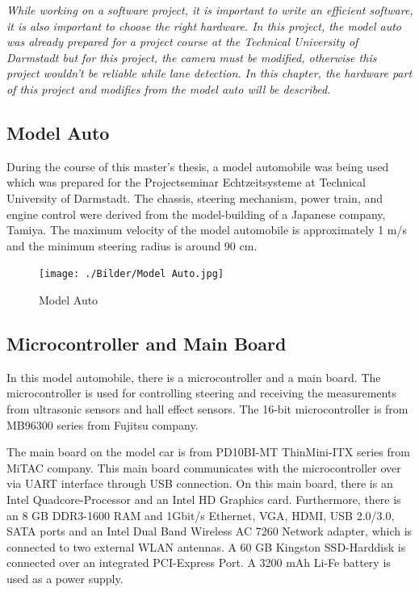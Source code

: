 \emph{\color{blue}While working on a software project, it is important to write an efficient software, it is also important to choose the right hardware. In this project, the model auto was already prepared for a project course at the Technical University of Darmstadt but for this project, the camera must be modified, otherwise this project wouldn't be reliable while lane detection. In this chapter, the hardware part of this project and modifies from the model auto will be described.} 


%
\subsection{Model Auto}\label{sec:Model Auto}


During the course of this master's thesis, a model automobile was being used which was prepared for the Projectseminar 
Echtzeitsysteme at Technical University of Darmstadt. The chassis, steering mechanism, power train, and engine control 
were derived from the model-building of a Japanese company, Tamiya. The maximum velocity of the model automobile is 
approximately 1 m/s and the minimum steering radius is around 90 cm. 

\begin{figure}[H]
	\centering
	\hspace*{0cm}   
	\texttt{[image: ./Bilder/Model Auto.jpg]}
	\caption{Model Auto}
\end{figure}

%
\subsection{Microcontroller and Main Board}\label{sec:Microcontroller and Main Board}


In this model automobile, there is a microcontroller and a main board. The microcontroller is used for controlling steering 
and receiving the measurements from ultrasonic sensors and hall effect sensors. The 16-bit microcontroller is from 
MB96300 series from Fujitsu company.

The main board on the model car is from PD10BI-MT ThinMini-ITX series from MiTAC company. This main board communicates 
with the microcontroller over via UART interface through USB connection. On this main board, there is an Intel 
Quadcore-Processor and an Intel HD Graphics card. Furthermore, there is an 8 GB DDR3-1600 RAM and 1Gbit/s Ethernet, VGA, HDMI, USB 2.0/3.0, SATA ports and an Intel Dual Band Wireless AC 7260 Network adapter, which is connected to two external WLAN antennas. A 60 GB Kingston SSD-Harddisk is connected over an integrated PCI-Express Port. A 3200 mAh Li-Fe battery is used as a power supply.
%

